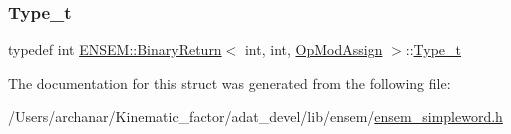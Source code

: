 \mbox{\label{structENSEM_1_1BinaryReturn_3_01int_00_01int_00_01OpModAssign_01_4_a3b37439e87d2e89d2bf9f5b7738f2a61}} 
\subsubsection{\texorpdfstring{Type\_t}{Type\_t}\hspace{0.1cm}{\footnotesize\ttfamily [2/2]}}
{\footnotesize\ttfamily typedef int \mbox{\hyperlink{structENSEM_1_1BinaryReturn}{E\+N\+S\+E\+M\+::\+Binary\+Return}}$<$ int, int, \mbox{\hyperlink{structENSEM_1_1OpModAssign}{Op\+Mod\+Assign}} $>$\+::\mbox{\hyperlink{structENSEM_1_1BinaryReturn_3_01int_00_01int_00_01OpModAssign_01_4_a3b37439e87d2e89d2bf9f5b7738f2a61}{Type\+\_\+t}}}



The documentation for this struct was generated from the following file\+:\begin{DoxyCompactItemize}
\item 
/\+Users/archanar/\+Kinematic\+\_\+factor/adat\+\_\+devel/lib/ensem/\mbox{\hyperlink{lib_2ensem_2ensem__simpleword_8h}{ensem\+\_\+simpleword.\+h}}\end{DoxyCompactItemize}
